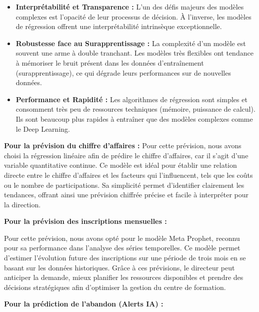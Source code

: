 \begin{itemize}[label=\textbullet]
\item \textbf{Interprétabilité et Transparence :} L'un des défis majeurs des modèles complexes est l'opacité de leur processus de décision. À l'inverse, les modèles de régression offrent une interprétabilité intrinsèque exceptionnelle.

\item \textbf{Robustesse face au Surapprentissage :} La complexité d'un modèle est souvent une arme à double tranchant. Les modèles très flexibles ont tendance à mémoriser le bruit présent dans les données d'entraînement (surapprentissage), ce qui dégrade leurs performances sur de nouvelles données.

\item\textbf{Performance et Rapidité :} Les algorithmes de régression sont simples et consomment très peu de ressources techniques (mémoire, puissance de calcul). Ils sont beaucoup plus rapides à entraîner que des modèles complexes comme le Deep Learning.
\end{itemize}


\noindent\textbf{Pour la prévision du chiffre d’affaires :}
\noindent Pour cette prévision, nous avons choisi la régression linéaire afin de prédire le chiffre d’affaires, car il s’agit d’une variable quantitative continue. Ce modèle est idéal pour établir une relation directe entre le chiffre d’affaires et les facteurs qui l’influencent, tels que les coûts ou le nombre de participations. Sa simplicité permet d’identifier clairement les tendances, offrant ainsi une prévision chiffrée précise et facile à interpréter pour la direction.
\vspace{0.3cm}

\noindent\textbf{Pour la prévision des inscriptions mensuelles :} 

\noindent Pour cette prévision, nous avons opté pour le modèle Meta Prophet, reconnu pour sa performance dans l’analyse des séries temporelles. Ce modèle permet d’estimer l’évolution future des inscriptions sur une période de trois mois en se basant sur les données historiques. Grâce à ces prévisions, le directeur peut anticiper la demande, mieux planifier les ressources disponibles et prendre des décisions stratégiques afin d’optimiser la gestion du centre de formation.
\vspace{0.3cm}

\noindent \textbf{Pour la prédiction de l'abandon (Alerts IA) :}

